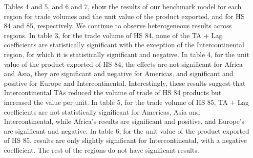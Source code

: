 \documentclass[12pt]{article}%
\begin{document}
Tables 4 and 5, and 6 and 7, show the results of our benchmark model for
each region for trade volumes and the unit value of the product
exported, and for HS 84 and 85, respectively. We continue to observe
heterogeneous results across regions. In table 3, for the trade volume
of HS 84, none of the TA + Lag coefficients are statistically
significant with the exception of the Intercontinental region, for which
it is statistically significant and negative. In table 4, for the unit
value of the product exported of HS 84, the effects are not significant
for Africa and Asia, they are significant and negative for Americas, and
significant and positive for Europe and Intercontinental. Interestingly,
these results suggest that Intercontinental TAs reduced the volume of
trade of HS 84 products but increased the value per unit. In table 5,
for the trade volume of HS 85, TA + Lag coefficients are not
statistically significant for Americas, Asia and Intercontinental, while
Africa's results are significant and positive, and Europe's are
significant and negative. In table 6, for the unit value of the product
exported of HS 85, results are only slightly significant for
Intercontinental, with a negative coefficient. The rest of the regions
do not have significant results.
\end{document}
